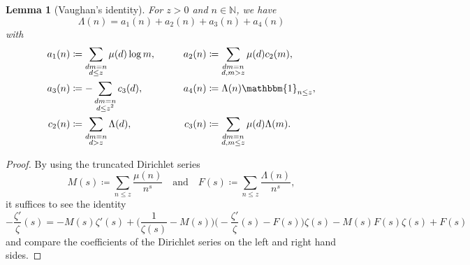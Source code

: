 \documentclass[hidelinks]{amsart}
\numberwithin{equation}{section}
\theoremstyle{plain}
\newtheorem{lemma}{Lemma}
\theoremstyle{definition}
\begin{document}
\begin{lemma}[Vaughan's identity]
\label{lem:Vaughan}
For $z>0$ and $n\in\mathbb{N}$, we have
\[
\Lambda(n)
=
a_{1}(n)+a_{2}(n)+a_{3}(n)+a_{4}(n)
\]
with
\begin{alignat}{3}
a_{1}(n)
&\coloneqq
\sum_{\substack{
dm=n\\
d\le z
}}
\mu(d)\log m,
&\qquad
a_{2}(n)
&\coloneqq
\sum_{\substack{
dm=n\\
d,m>z
}}
\mu(d)c_{2}(m),\\
a_{3}(n)
&\coloneqq
-
\sum_{\substack{
dm=n\\
d\le z^{2}
}}
c_{3}(d),
&\qquad
a_{4}(n)
&\coloneqq
\Lambda(n)\mathbbm{1}_{n\le z},\\
c_{2}(n)
&\coloneqq
\sum_{\substack{
dm=n\\
d>z
}}
\Lambda(d),
&\qquad
c_{3}(n)
&\coloneqq
\sum_{\substack{
dm=n\\
d,m\le z
}}
\mu(d)\Lambda(m).
\end{alignat}
\end{lemma}
\begin{proof}
By using the truncated Dirichlet series
\[
M(s)
\coloneqq
\sum_{n\le z}
\frac{\mu(n)}{n^{s}}
\quad\text{and}\quad
F(s)
\coloneqq
\sum_{n\le z}
\frac{\Lambda(n)}{n^{s}},
\]
it suffices to see the identity
\[
-\frac{\zeta'}{\zeta}(s)
=
-M(s)\zeta'(s)
+\biggl(\frac{1}{\zeta(s)}-M(s)\biggr)\biggl(-\frac{\zeta'}{\zeta}(s)-F(s)\biggr)\zeta(s)
-M(s)F(s)\zeta(s)
+F(s)
\]
and compare the coefficients of the Dirichlet series on the left and right hand sides.
\end{proof}
\end{document}
